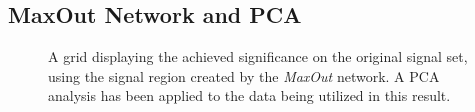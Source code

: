 \subsection{MaxOut Network and PCA}
\begin{figure}
    \caption{A grid displaying the achieved significance on the original signal set, using the signal region 
    created by the \emph{MaxOut} network. A \ac{PCA} analysis has been applied to the data being utilized in this result.}
    \label{fig:MaxOutPCAGridSig}
\end{figure}
